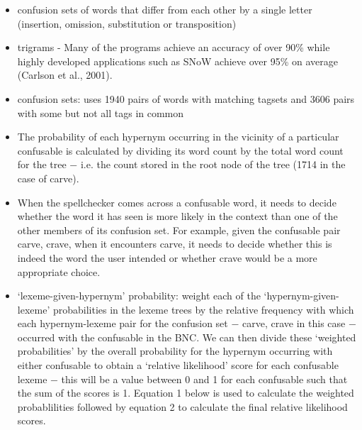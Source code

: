 \documentclass[a4paper,english,12pt]{article}
\begin{document}
\begin{spacing}{1.0}
\begin{itemize}
\item confusion sets of words that differ from each other by a single letter (insertion, omission, substitution or transposition) \cite{Pedler2007}
\item trigrams - Many of the programs achieve an accuracy of over 90\% while highly developed applications
such as SNoW achieve over 95\% on average (Carlson et al., 2001). \cite{Pedler2007}
\item confusion sets: \cite{Pedler2007} uses 1940 pairs of words with matching tagsets and 3606 pairs with some but not all tags in common
\item The probability of each hypernym occurring in the vicinity of a particular confusable is calculated by dividing its word count by the total word count for the tree − i.e. the count stored in the root node of the tree (1714 in the case of carve).
\item When the spellchecker comes across a confusable word, it needs to decide whether the word it has seen is more likely in the context than one of the other members of its confusion set. For example, given the confusable pair {carve, crave}, when it encounters carve, it needs to decide whether this is indeed the word the user intended or whether crave would be a more appropriate choice.
\item ‘lexeme-given-hypernym’ probability: weight each of the ‘hypernym-given-lexeme’ probabilities in the lexeme trees by the relative frequency with which each hypernym-lexeme pair for the confusion set − {carve, crave} in this case − occurred with the confusable in the BNC. We can then divide these ‘weighted probabilities’ by the overall probability for the hypernym occurring with either confusable to obtain a ‘relative likelihood’ score for each confusable lexeme − this will be a value between 0 and 1 for each confusable such that the sum of the scores is 1. Equation 1 below is used to calculate the weighted probablilities followed by equation 2 to calculate the final relative likelihood scores.


\end{itemize}
\end{spacing}
\end{document}
